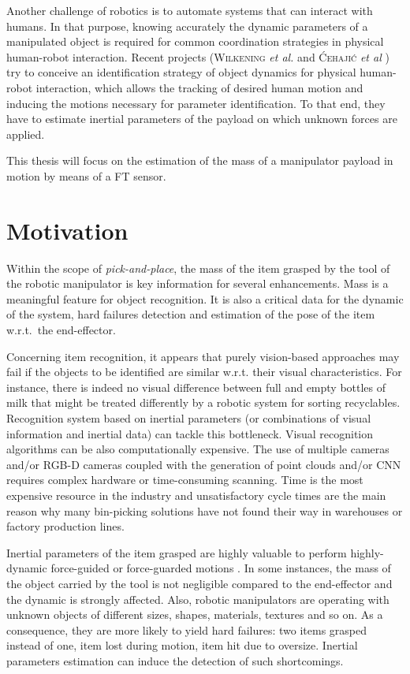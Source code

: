 \documentclass[/home/francois/latex/report/main.tex]{subfiles}
\begin{document}
Another challenge of robotics is to automate systems that can interact with humans. In that purpose, knowing accurately the dynamic parameters of a manipulated object is required for common coordination strategies in physical human-robot interaction. Recent projects (\textsc{Wilkening} \textit{et al.} \cite{Wilkening2016} and \textsc{Ćehajić} \textit{et al} \cite{Ćehajić2017}) try to conceive an identification strategy of object dynamics for physical human-robot interaction, which allows the tracking of desired human motion and inducing the motions necessary for parameter identification. To that end, they have to estimate inertial parameters of the payload on which unknown forces are applied.

This thesis will focus on the estimation of the mass of a manipulator payload in motion by means of a \ac{FT} sensor.

\section{Motivation}

Within the scope of \textit{pick-and-place}, the mass of the item grasped by the tool of the robotic manipulator is key information for several enhancements. Mass is a meaningful feature for object recognition. It is also a critical data for the dynamic of the system, hard failures detection and estimation of the pose of the item w.r.t.\ the end-effector.

Concerning item recognition, it appears that purely vision-based approaches may fail if the objects to be identified are similar w.r.t. their visual characteristics. For instance, there is indeed no visual difference between full and empty bottles of milk that might be treated differently by a robotic system for sorting recyclables. Recognition system based on inertial parameters (or combinations of visual information and inertial data) can tackle this bottleneck.
Visual recognition algorithms can be also computationally expensive. The use of multiple cameras and/or RGB-D cameras coupled with the generation of point clouds and/or \ac{CNN} requires complex hardware or time-consuming scanning. Time is the most expensive resource in the industry and unsatisfactory cycle times are the main reason why many bin-picking solutions have not found their way in warehouses or factory production lines.

Inertial parameters of the item grasped are highly valuable to perform highly-dynamic force-guided or force-guarded motions \cite{Garcia2006, KubusKroger2008}. In some instances, the mass of the object carried by the tool is not negligible compared to the end-effector and the dynamic is strongly affected.
Also, robotic manipulators are operating with unknown objects of different sizes, shapes, materials, textures and so on. As a consequence, they are more likely to yield hard failures: two items grasped instead of one, item lost during motion, item hit due to oversize. Inertial parameters estimation can induce the detection of such shortcomings.
\end{document}
